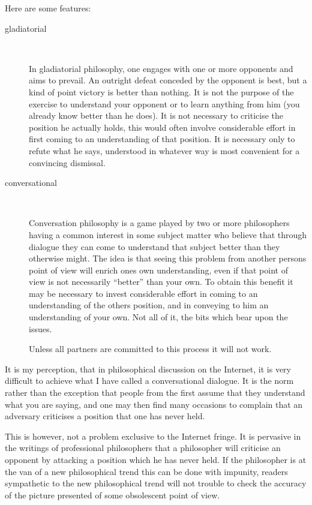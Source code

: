 \documentclass{article}
\begin{document}
Here are some features:

\begin{description}

\item[gladiatorial] \ 

In gladiatorial philosophy, one engages with one or more opponents and aims to prevail.
An outright defeat conceded by the opponent is best, but a kind of point victory is better than nothing.
It is not the purpose of the exercise to understand your opponent or to learn anything from him (you already know better than he does).
It is not necessary to criticise the position he actually holds, this would often involve considerable effort in first coming to an understanding of that position.
It is necessary only to refute what he says, understood in whatever way is most convenient for a convincing dismissal.

\item[conversational] \ 

Conversation philosophy is a game played by two or more philosophers having a common interest in some subject matter who believe that through dialogue they can come to understand that subject better than they otherwise might.
The idea is that seeing this problem from another persons point of view will enrich ones own understanding, even if that point of view is not necessarily ``better'' than your own.
To obtain this benefit it may be necessary to invest considerable effort in coming to an understanding of the others position, and in conveying to him an understanding of your own.
Not all of it, the bits which bear upon the issues.

Unless all partners are committed to this process it will not work.
\end{description}

It is my perception, that in philosophical discussion on the Internet, it is very difficult to achieve what I have called a conversational dialogue.
It is the norm rather than the exception that people from the first assume that they understand what you are saying, and one may then find many occasions to complain that an adversary criticises a position that one has never held.

This is however, not a problem exclusive to the Internet fringe.
It is pervasive in the writings of professional philosophers that a philosopher will criticise an opponent by attacking a position which he has never held.
If the philosopher is at the van of a new philosophical trend this can be done with impunity, readers sympathetic to the new philosophical trend will not trouble to check the accuracy of the picture presented of some obsolescent point of view.
\end{document}
